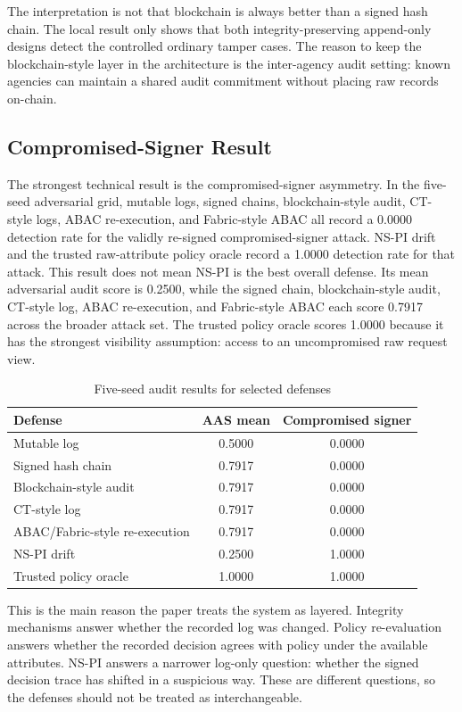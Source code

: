 The interpretation is not that blockchain is always better than a signed hash
chain. The local result only shows that both integrity-preserving append-only
designs detect the controlled ordinary tamper cases. The reason to keep the
blockchain-style layer in the architecture is the inter-agency audit setting:
known agencies can maintain a shared audit commitment without placing raw
records on-chain.

\subsection{Compromised-Signer Result}

The strongest technical result is the compromised-signer asymmetry. In the
five-seed adversarial grid, mutable logs, signed chains, blockchain-style
audit, CT-style logs, ABAC re-execution, and Fabric-style ABAC all record a
0.0000 detection rate for the validly re-signed compromised-signer attack.
NS-PI drift and the trusted raw-attribute policy oracle record a 1.0000
detection rate for that attack. This result does not mean NS-PI is the best
overall defense. Its mean adversarial audit score is 0.2500, while the signed
chain, blockchain-style audit, CT-style log, ABAC re-execution, and
Fabric-style ABAC each score 0.7917 across the broader attack set. The
trusted policy oracle scores 1.0000 because it has the strongest visibility
assumption: access to an uncompromised raw request view.

\begin{table}[t]
\centering
\caption{Five-seed audit results for selected defenses}
\label{tab:compromised-signer}
\begin{tabular}{lcc}
\toprule
Defense & AAS mean & Compromised signer \\
\midrule
Mutable log & 0.5000 & 0.0000 \\
Signed hash chain & 0.7917 & 0.0000 \\
Blockchain-style audit & 0.7917 & 0.0000 \\
CT-style log & 0.7917 & 0.0000 \\
ABAC/Fabric-style re-execution & 0.7917 & 0.0000 \\
NS-PI drift & 0.2500 & 1.0000 \\
Trusted policy oracle & 1.0000 & 1.0000 \\
\bottomrule
\end{tabular}
\end{table}

This is the main reason the paper treats the system as layered. Integrity
mechanisms answer whether the recorded log was changed. Policy re-evaluation
answers whether the recorded decision agrees with policy under the available
attributes. NS-PI answers a narrower log-only question: whether the signed
decision trace has shifted in a suspicious way. These are different questions,
so the defenses should not be treated as interchangeable.


